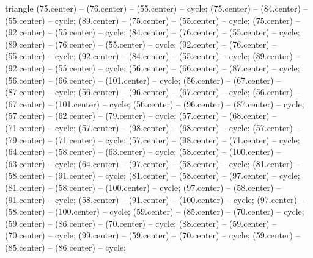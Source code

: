 \begin{pgfonlayer}{triangle}
 (75.center) -- (76.center) -- (55.center) -- cycle; 
 (75.center) -- (84.center) -- (55.center) -- cycle; 
 (89.center) -- (75.center) -- (55.center) -- cycle; 
 (75.center) -- (92.center) -- (55.center) -- cycle; 
 (84.center) -- (76.center) -- (55.center) -- cycle; 
 (89.center) -- (76.center) -- (55.center) -- cycle; 
 (92.center) -- (76.center) -- (55.center) -- cycle; 
 (92.center) -- (84.center) -- (55.center) -- cycle; 
 (89.center) -- (92.center) -- (55.center) -- cycle; 
 (56.center) -- (66.center) -- (87.center) -- cycle; 
 (56.center) -- (66.center) -- (101.center) -- cycle; 
 (56.center) -- (67.center) -- (87.center) -- cycle; 
 (56.center) -- (96.center) -- (67.center) -- cycle; 
 (56.center) -- (67.center) -- (101.center) -- cycle; 
 (56.center) -- (96.center) -- (87.center) -- cycle; 
 (57.center) -- (62.center) -- (79.center) -- cycle; 
 (57.center) -- (68.center) -- (71.center) -- cycle; 
 (57.center) -- (98.center) -- (68.center) -- cycle; 
 (57.center) -- (79.center) -- (71.center) -- cycle; 
 (57.center) -- (98.center) -- (71.center) -- cycle; 
 (64.center) -- (58.center) -- (63.center) -- cycle; 
 (58.center) -- (100.center) -- (63.center) -- cycle; 
 (64.center) -- (97.center) -- (58.center) -- cycle; 
 (81.center) -- (58.center) -- (91.center) -- cycle; 
 (81.center) -- (58.center) -- (97.center) -- cycle; 
 (81.center) -- (58.center) -- (100.center) -- cycle; 
 (97.center) -- (58.center) -- (91.center) -- cycle; 
 (58.center) -- (91.center) -- (100.center) -- cycle; 
 (97.center) -- (58.center) -- (100.center) -- cycle; 
 (59.center) -- (85.center) -- (70.center) -- cycle; 
 (59.center) -- (86.center) -- (70.center) -- cycle; 
 (88.center) -- (59.center) -- (70.center) -- cycle; 
 (99.center) -- (59.center) -- (70.center) -- cycle; 
 (59.center) -- (85.center) -- (86.center) -- cycle; 

\end{pgfonlayer}
